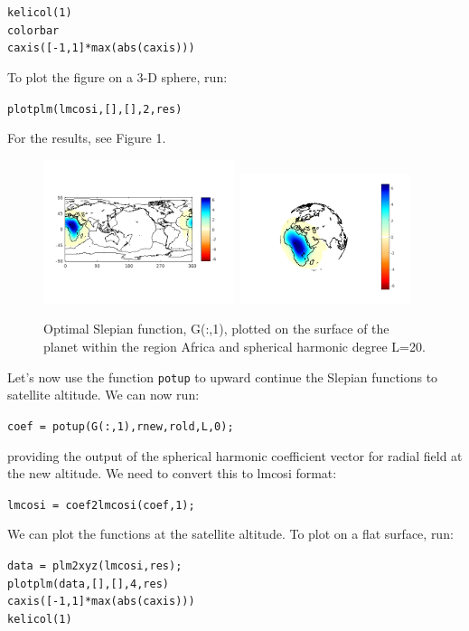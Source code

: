 \documentclass[11pt]{article}
\begin{document}
\verb+kelicol(1)+\\
\verb+colorbar+\\
\verb+caxis([-1,1]*max(abs(caxis)))+

To plot the figure on a 3-D sphere, run:

\verb+plotplm(lmcosi,[],[],2,res)+

For the results, see Figure 1.
\begin{figure}[H]
  \includegraphics[width=0.5\textwidth]{figures/G_1_flatml.png}
  \includegraphics[width=0.45\textwidth]{figures/G_1_ml.png}
  \caption{Optimal Slepian function, G(:,1), plotted on the surface of the planet within the region Africa and spherical harmonic degree L=20.}
\label{G(:,1)}
\end{figure}
Let's now use the function \verb+potup+ to upward continue the Slepian functions to satellite altitude.  We can now run:

\verb+coef = potup(G(:,1),rnew,rold,L,0);+

providing the output of the spherical harmonic coefficient vector for radial field at the new altitude.  We need to convert this to lmcosi format:

\verb+lmcosi = coef2lmcosi(coef,1);+

We can plot the functions at the satellite altitude.  To plot on a flat surface, run:

\verb+data = plm2xyz(lmcosi,res);+\\
\verb+plotplm(data,[],[],4,res)+\\
\verb+caxis([-1,1]*max(abs(caxis)))+\\
\verb+kelicol(1)+
\end{document}
